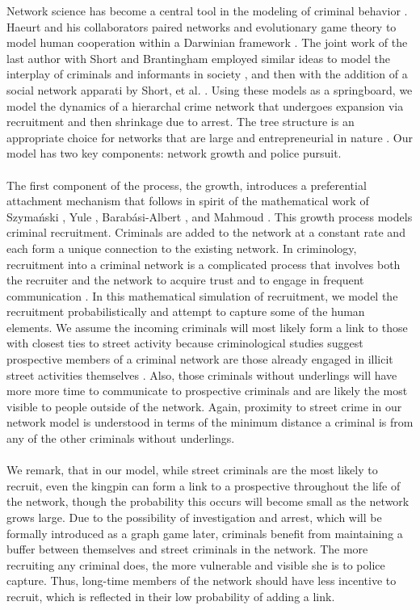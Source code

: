 \documentclass[%
 reprint,
 amsmath,amssymb,
 aps,
]{revtex4-1}
\theoremstyle{plain}
\theoremstyle{definition}
\begin{document}
Network science has become a central tool in the modeling of criminal behavior \cite{mcIllwain, browning, tita}.  Haeurt and his collaborators paired networks and evolutionary game theory to model human cooperation within a Darwinian framework \cite{Hauert1, Hauert2, Hauert3}.  The joint work of the last author with Short and Brantingham employed similar ideas to model the interplay of criminals and informants in society \cite{maria2010, maria2012}, and then with the addition of a social network apparati by Short, et al. \cite{mccallaEGT}.   Using these models as a springboard, we model the dynamics of a hierarchal crime network that undergoes expansion via recruitment and then shrinkage due to arrest.  The tree structure is an appropriate choice for networks that are large and entrepreneurial in nature \cite{crime1, crime2}.  Our model has two key components: network growth and police pursuit.\\  
\\
The first component of the process, the growth, introduces a preferential attachment mechanism that follows in spirit of the mathematical work of Szyma\'{n}ski \cite{sz}, Yule \cite{Yule}, Barab\'{a}si-Albert \cite{BA1}, and Mahmoud \cite{Mahmoud1, Mahmoud2}.  This growth process models criminal recruitment.  Criminals are added to the network at a constant rate and each form a unique connection to the existing network.  In criminology, recruitment into a criminal network is a complicated process that involves both the recruiter and the network to acquire trust and to engage in frequent communication \cite{recruitment1, recruitment2}.  In this mathematical simulation of recruitment, we model the recruitment probabilistically and attempt to capture some of the human elements.  We assume the incoming criminals will most likely form a link to those with closest ties to street activity because criminological studies suggest prospective members of a criminal network are those already engaged in illicit street activities themselves \cite{recruitment1}.  Also, those criminals without underlings will have more more time to communicate to prospective criminals and are likely the most visible to people outside of the network.  Again, proximity to street crime in our network model is understood in terms of the minimum distance a criminal is from any of the other criminals without underlings.\\
\\
We remark, that in our model, while street criminals are the most likely to recruit, even the kingpin can form a link to a prospective throughout the life of the network, though the probability this occurs will become small as the network grows large.  Due to the possibility of investigation and arrest, which will be formally introduced as a graph game later, criminals benefit from maintaining a buffer between themselves and street criminals in the network.   The more recruiting any criminal does, the more vulnerable and visible she is to police capture.  Thus, long-time members of the network should have less incentive to recruit, which is reflected in their low probability of adding a link.\\
\end{document}
